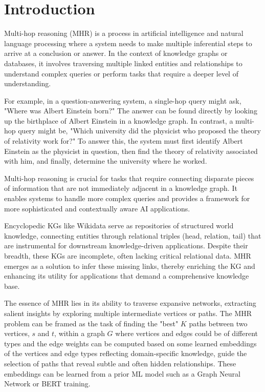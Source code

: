 \documentclass[sigconf]{acmart}
\begin{document}
\section{Introduction}
Multi-hop reasoning (MHR) is a process in artificial intelligence and natural language processing where a system needs to make multiple inferential steps to arrive at a conclusion or answer. In the context of knowledge graphs or databases, it involves traversing multiple linked entities and relationships to understand complex queries or perform tasks that require a deeper level of understanding.

For example, in a question-answering system, a single-hop query might ask, "Where was Albert Einstein born?" The answer can be found directly by looking up the birthplace of Albert Einstein in a knowledge graph. In contrast, a multi-hop query might be, "Which university did the physicist who proposed the theory of relativity work for?" To answer this, the system must first identify Albert Einstein as the physicist in question, then find the theory of relativity associated with him, and finally, determine the university where he worked.

Multi-hop reasoning is crucial for tasks that require connecting disparate pieces of information that are not immediately adjacent in a knowledge graph. It enables systems to handle more complex queries and provides a framework for more sophisticated and contextually aware AI applications. 

Encyclopedic KGs like Wikidata serve as repositories of structured world knowledge, connecting entities through relational triples (head, relation, tail) that are instrumental for downstream knowledge-driven applications. Despite their breadth, these KGs are incomplete, often lacking critical relational data. MHR emerges as a solution to infer these missing links, thereby enriching the KG and enhancing its utility for applications that demand a comprehensive knowledge base. 

The essence of MHR lies in its ability to traverse expansive networks, extracting salient insights by exploring multiple intermediate vertices or paths. The MHR problem can be framed as the task of finding the "best" $K$ paths between two vertices, $s$ and $t$, within a graph $G$ where vertices and edges could be of different types and the edge weights can be computed based on some learned embeddings \cite{guo2016entity} of the vertices and edge types reflecting domain-specific knowledge, guide the selection of paths that reveal subtle and often hidden relationships. These embeddings can be learned from a prior ML model such as a Graph Neural Network \cite{gilmer2020message,khemani2024review} or BERT \cite{reimers2019sentence} training. 
\end{document}
